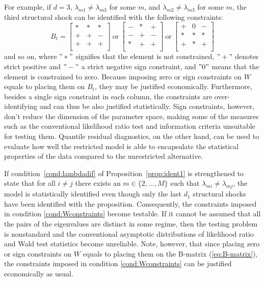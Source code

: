 \documentclass[nojss]{jss}
\begin{document}
For example, if $d=3$, $\lambda_{m1}\neq\lambda_{m3}$ for some $m$, and $\lambda_{m2}\neq\lambda_{m3}$ for some $m$, the third structural shock can be identified with the following constraints:
\begin{equation}
B_t=\begin{bmatrix}
* & * & *    \\
+ & + &  - \\
+ & + & + \\
\end{bmatrix}
\ \text{or} \
\begin{bmatrix}
- & * & + \\
- & + & -  \\
* & + & + \\
\end{bmatrix}
\ \text{or} \
\begin{bmatrix}
+ & 0 & -  \\
* & * & *  \\
+ & * & + \\
\end{bmatrix}
\end{equation}
and so on, where $"*"$ signifies that the element is not constrained, $"+"$ denotes strict positive and $"-"$ a strict negative sign constraint, and $"0"$ means that the element is constrained to zero. Because imposing zero or sign constraints on $W$ equals to placing them on $B_t$, they may be justified economically. Furthermore, besides a single sign constraint in each column, the constraints are over-identifying and can thus be also justified statistically. Sign constraints, however, don't reduce the dimension of the parameter space, making some of the measures such as the conventional likelihood ratio test and information criteria unsuitable for testing them. Quantile residual diagnostics, on the other hand, can be used to evaluate how well the restricted model is able to encapsulate the statistical properties of the data compared to the unrestricted alternative.

If condition~\ref{cond:lambdadif} of Proposition~\ref{prop:ident1} is strengthened to state that for all $i\neq j$ there exists an $m\in\lbrace 2,...,M\rbrace$ such that $\lambda_{mi}\neq \lambda_{mj}$,  the model is statistically identified even though only the last $d_1$ structural shocks have been identified with the proposition.  Consequently,  the constraints imposed in condition \ref{cond:Wconstraints} become testable.  If it cannot be assumed that all the pairs of the eigenvalues are distinct in some regime,  then the testing problem is nonstandard and the conventional asymptotic distributions of likelihood ratio and Wald test statistics become unreliable.  Note,  however, that since placing zero or sign constraints on $W$ equals to placing them on the B-matrix (\ref{eq:B-matrix}),  the constraints imposed in condition \ref{cond:Wconstraints} can be justified economically as usual.
\end{document}
